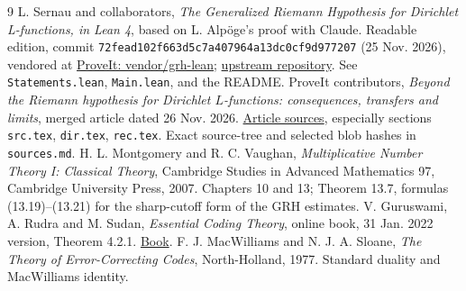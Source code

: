 \documentclass[11pt]{article}
\theoremstyle{remark}\newtheorem{remark}[theorem]{Remark}
\begin{document}
\clearpage
\begin{thebibliography}{9}
 L. Sernau and collaborators, \emph{The Generalized Riemann Hypothesis for Dirichlet L-functions, in Lean 4}, based on L. Alp\"oge's proof with Claude. Readable edition, commit \texttt{72fead102f663d5c7a407964a13dc0cf9d977207} (25 Nov. 2026), vendored at \href{https://github.com/VladimirReshetnikov/ProveIt/tree/main/Analysis/GeneralizedRiemannHypothesis/vendor/grh-lean}{ProveIt: vendor/grh-lean}; \href{https://github.com/lsernau/grh-lean}{upstream repository}. See \texttt{Statements.lean}, \texttt{Main.lean}, and the README.
 ProveIt contributors, \emph{Beyond the Riemann hypothesis for Dirichlet $L$-functions: consequences, transfers and limits}, merged article dated 26 Nov. 2026. \href{https://github.com/VladimirReshetnikov/ProveIt/tree/main/Analysis/GeneralizedRiemannHypothesis/Article}{Article sources}, especially sections \texttt{src.tex}, \texttt{dir.tex}, \texttt{rec.tex}. Exact source-tree and selected blob hashes in \texttt{sources.md}.
 H. L. Montgomery and R. C. Vaughan, \emph{Multiplicative Number Theory I: Classical Theory}, Cambridge Studies in Advanced Mathematics 97, Cambridge University Press, 2007. Chapters 10 and 13; Theorem 13.7, formulas (13.19)--(13.21) for the sharp-cutoff form of the GRH estimates.
 V. Guruswami, A. Rudra and M. Sudan, \emph{Essential Coding Theory}, online book, 31 Jan. 2022 version, Theorem 4.2.1. \href{https://cse.buffalo.edu/faculty/atri/courses/coding-theory/book/prev-ver/web-coding-book-Jan31-2022.pdf}{Book}.
 F. J. MacWilliams and N. J. A. Sloane, \emph{The Theory of Error-Correcting Codes}, North-Holland, 1977. Standard duality and MacWilliams identity.
\end{thebibliography}
\end{document}
